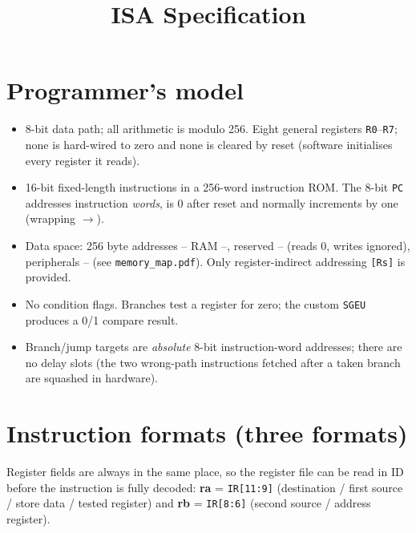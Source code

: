 \documentclass[10pt,a4paper]{article}
\title{\vspace{-1.2cm}\textbf{ISA Specification}\\[2pt]\large \project}
\author{\course}
\date{}
\begin{document}
\maketitle
\vspace{-1cm}

\section{Programmer's model}
\begin{itemize}
\item 8-bit data path; all arithmetic is modulo 256. Eight general registers \texttt{R0}--\texttt{R7};
      none is hard-wired to zero and none is cleared by reset (software initialises every register it reads).
\item 16-bit fixed-length instructions in a 256-word instruction ROM. The 8-bit \texttt{PC} addresses
      instruction \emph{words}, is 0 after reset and normally increments by one (wrapping $\rightarrow$).
\item Data space: 256 byte addresses -- RAM --, reserved -- (reads 0, writes ignored),
      peripherals -- (see \texttt{memory\_map.pdf}). Only register-indirect addressing \texttt{[Rs]} is provided.
\item No condition flags. Branches test a register for zero; the custom \texttt{SGEU} produces a 0/1 compare result.
\item Branch/jump targets are \emph{absolute} 8-bit instruction-word addresses; there are no delay slots
      (the two wrong-path instructions fetched after a taken branch are squashed in hardware).
\end{itemize}

\section{Instruction formats (three formats)}
Register fields are always in the same place, so the register file can be read in ID before the
instruction is fully decoded: \textbf{ra} = \texttt{IR[11:9]} (destination / first source / store data / tested register) and
\textbf{rb} = \texttt{IR[8:6]} (second source / address register).
\end{document}
